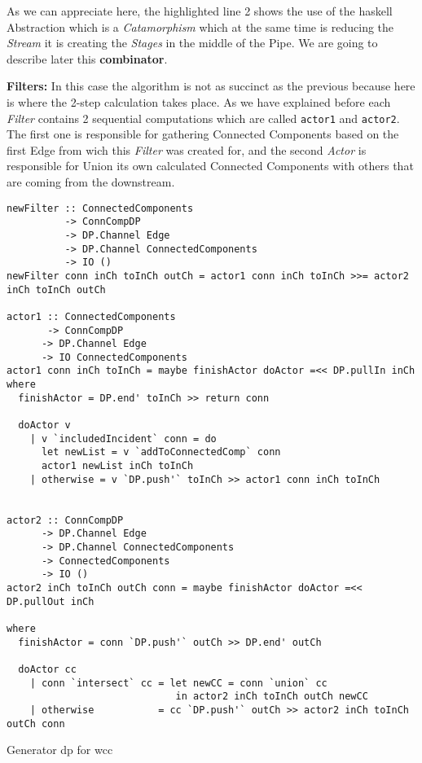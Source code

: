 \documentclass[12pt]{article}
\begin{document}
As we can appreciate here, the highlighted line 2 shows the use of the \acrshort{haskell} Abstraction which is a \textit{Catamorphism} which at the same time is reducing the \textit{Stream}
it is creating the \textit{Stages} in the middle of the Pipe. We are going to describe later this \textbf{combinator}.

\textbf{Filters:}
In this case the algorithm is not as succinct as the previous because here is where the 2-step calculation takes place. As we have explained before each \textit{Filter} contains 2 sequential 
computations which are called \texttt{actor1} and \texttt{actor2}. The first one is responsible for gathering Connected Components based on the first Edge from wich 
this \textit{Filter} was created for, and the second \textit{Actor} is responsible for Union its own calculated Connected Components with others that are coming from the downstream.

\begin{listing}[H]
\begin{verbatim}
newFilter :: ConnectedComponents
          -> ConnCompDP
          -> DP.Channel Edge
          -> DP.Channel ConnectedComponents
          -> IO ()
newFilter conn inCh toInCh outCh = actor1 conn inCh toInCh >>= actor2 inCh toInCh outCh

actor1 :: ConnectedComponents 
       -> ConnCompDP 
      -> DP.Channel Edge
      -> IO ConnectedComponents
actor1 conn inCh toInCh = maybe finishActor doActor =<< DP.pullIn inCh
where
  finishActor = DP.end' toInCh >> return conn

  doActor v
    | v `includedIncident` conn = do
      let newList = v `addToConnectedComp` conn
      actor1 newList inCh toInCh
    | otherwise = v `DP.push'` toInCh >> actor1 conn inCh toInCh


actor2 :: ConnCompDP
      -> DP.Channel Edge 
      -> DP.Channel ConnectedComponents 
      -> ConnectedComponents
      -> IO ()
actor2 inCh toInCh outCh conn = maybe finishActor doActor =<< DP.pullOut inCh

where
  finishActor = conn `DP.push'` outCh >> DP.end' outCh

  doActor cc 
    | conn `intersect` cc = let newCC = conn `union` cc 
                             in actor2 inCh toInCh outCh newCC
    | otherwise           = cc `DP.push'` outCh >> actor2 inCh toInCh outCh conn
\end{verbatim}
\caption{Generator \acrshort{dp} for \acrshort{wcc}}
\label{src:haskell:3}
\end{listing}
\end{document}

